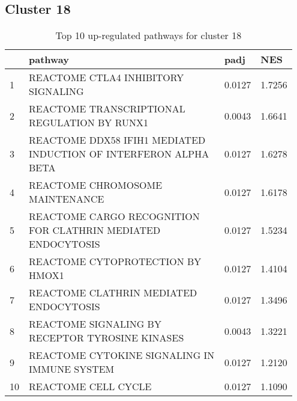 \documentclass{article}
\begin{document}
\subsection{Cluster 18 }
\begin{table}[H]
\centering
\begin{tabular}{p{0.05\linewidth}p{0.7\linewidth}p{0.1\linewidth}p{0.1\linewidth}}
  \hline
 & pathway & padj & NES \\ 
  \hline
1 & REACTOME CTLA4 INHIBITORY SIGNALING & 0.0127 & 1.7256 \\ 
  2 & REACTOME TRANSCRIPTIONAL REGULATION BY RUNX1 & 0.0043 & 1.6641 \\ 
  3 & REACTOME DDX58 IFIH1 MEDIATED INDUCTION OF INTERFERON ALPHA BETA & 0.0127 & 1.6278 \\ 
  4 & REACTOME CHROMOSOME MAINTENANCE & 0.0127 & 1.6178 \\ 
  5 & REACTOME CARGO RECOGNITION FOR CLATHRIN MEDIATED ENDOCYTOSIS & 0.0127 & 1.5234 \\ 
  6 & REACTOME CYTOPROTECTION BY HMOX1 & 0.0127 & 1.4104 \\ 
  7 & REACTOME CLATHRIN MEDIATED ENDOCYTOSIS & 0.0127 & 1.3496 \\ 
  8 & REACTOME SIGNALING BY RECEPTOR TYROSINE KINASES & 0.0043 & 1.3221 \\ 
  9 & REACTOME CYTOKINE SIGNALING IN IMMUNE SYSTEM & 0.0127 & 1.2120 \\ 
  10 & REACTOME CELL CYCLE & 0.0127 & 1.1090 \\ 
   \hline
\end{tabular}
\caption{Top 10 up-regulated pathways for cluster 18} 
\label{tab:q3_2_18}
\end{table}
\end{document}
